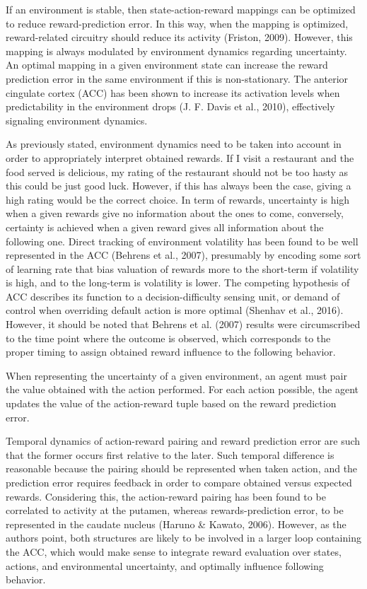 \documentclass[
]{/home/nicoluarte/Downloads/templates/PNAS-template-main.tex}
\begin{document}
If an environment is stable, then state-action-reward mappings can be
optimized to reduce reward-prediction error. In this way, when the
mapping is optimized, reward-related circuitry should reduce its
activity (Friston, 2009). However, this mapping is always modulated by
environment dynamics regarding uncertainty. An optimal mapping in a
given environment state can increase the reward prediction error in the
same environment if this is non-stationary. The anterior cingulate
cortex (ACC) has been shown to increase its activation levels when
predictability in the environment drops (J. F. Davis et al., 2010),
effectively signaling environment dynamics.

As previously stated, environment dynamics need to be taken into account
in order to appropriately interpret obtained rewards. If I visit a
restaurant and the food served is delicious, my rating of the restaurant
should not be too hasty as this could be just good luck. However, if
this has always been the case, giving a high rating would be the correct
choice. In term of rewards, uncertainty is high when a given rewards
give no information about the ones to come, conversely, certainty is
achieved when a given reward gives all information about the following
one. Direct tracking of environment volatility has been found to be well
represented in the ACC (Behrens et al., 2007), presumably by encoding
some sort of learning rate that bias valuation of rewards more to the
short-term if volatility is high, and to the long-term is volatility is
lower. The competing hypothesis of ACC describes its function to a
decision-difficulty sensing unit, or demand of control when overriding
default action is more optimal (Shenhav et al., 2016). However, it
should be noted that Behrens et al. (2007) results were circumscribed to
the time point where the outcome is observed, which corresponds to the
proper timing to assign obtained reward influence to the following
behavior.

When representing the uncertainty of a given environment, an agent must
pair the value obtained with the action performed. For each action
possible, the agent updates the value of the action-reward tuple based
on the reward prediction error.

Temporal dynamics of action-reward pairing and reward prediction error
are such that the former occurs first relative to the later. Such
temporal difference is reasonable because the pairing should be
represented when taken action, and the prediction error requires
feedback in order to compare obtained versus expected rewards.
Considering this, the action-reward pairing has been found to be
correlated to activity at the putamen, whereas rewards-prediction error,
to be represented in the caudate nucleus (Haruno \& Kawato, 2006).
However, as the authors point, both structures are likely to be involved
in a larger loop containing the ACC, which would make sense to integrate
reward evaluation over states, actions, and environmental uncertainty,
and optimally influence following behavior.
\end{document}

